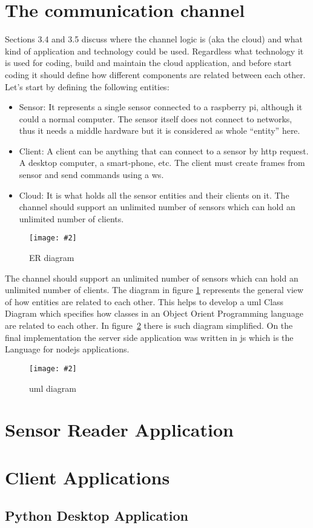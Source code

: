 \documentclass[hidelinks,11pt,a4paper,oneside,article]{memoir}
\newcommand{\putimage}[3][10] %
{
\begin{figure}[h]
	\centering
	\captionsetup{justification=centering}
	\texttt{[image: \#2]}
	\caption{#3}
	\label{fig:#2}
\end{figure}
}
\begin{document}
\section{The communication channel}
Sections 3.4 and 3.5 discuss where the channel logic is (aka the cloud) and what kind of application and technology could be used. Regardless what technology it is used for coding, build and maintain the cloud application, and before start coding it should define how different components are related between each other.
Let’s start by defining the following entities:
\begin{itemize}
    \item Sensor: It represents a single sensor connected to a raspberry pi, although it could a normal computer. The sensor itself does not connect to networks, thus it needs a middle hardware but it is considered as whole “entity” here.
    \item Client: A client can be anything that can connect to a sensor by \gls{http} request. A desktop computer, a smart-phone, etc. The client must create frames from sensor and send commands using a \gls{ws}.
    \item Cloud: It is what holds all the sensor entities and their clients on it.
    The channel should support an unlimited number of sensors which can hold an unlimited number of clients.
\end{itemize}
\putimage[15]{channel-er}{ER diagram}
The channel should support an unlimited number of sensors which can hold an unlimited number of clients.
The diagram in figure \ref{fig:channel-er} represents the general view of how entities are related to each other. This helps to develop a \gls{uml} Class Diagram which specifies how classes in an Object Orient Programming language are related to each other. In figure~\ref{fig:channel-uml} there is such diagram simplified.
On the final implementation the server side application was written in \gls{js} which is the Language for \gls{nodejs} applications.
\putimage[15]{channel-uml}{\gls{uml} diagram}

\section{Sensor Reader Application}

\section{Client Applications}
\subsection{Python Desktop Application}
\end{document}
